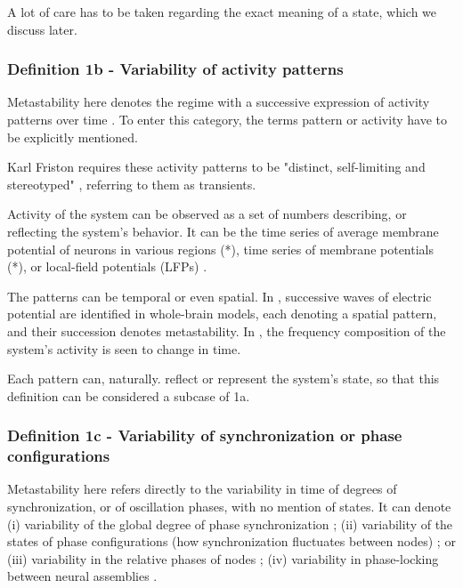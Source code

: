 \documentclass[preprint,superscriptaddress,showpacs,amsmath,amssymb,aps,pre,floatfix]{revtex4-1}
\theoremstyle{definition}
\begin{document}
A lot of care has to be taken regarding the exact meaning of a state, which we discuss later. %


\subsubsection{Definition 1b - Variability of activity patterns}
\label{sec:varpatterns}
Metastability here denotes the regime with a successive expression of activity patterns over time \cite{friston_1997, friston_2000transients, varela_2001, roberts_2019}. To enter this category, the terms pattern or activity have to be explicitly mentioned.

Karl Friston requires these activity patterns to be "distinct, self-limiting and stereotyped" \cite{friston_1997}, referring to them as transients. 

Activity of the system can be observed as a set of numbers describing, or reflecting the system's behavior. It can be the time series of average membrane potential of neurons in various regions \cite{roberts_2019}(*), time series of membrane potentials \cite{friston_1997, friston_2000transients}(*), or local-field potentials (LFPs) \cite{friston_2000transients}. 

The patterns can be temporal or even spatial. In \cite{roberts_2019}, successive waves of electric potential are identified in whole-brain models, each denoting a spatial pattern, and their succession denotes metastability. In \cite{friston_2000transients}, the frequency composition of the system's activity is seen to change in time.

Each pattern can, naturally. reflect or represent the system's state, so that this definition can be considered a subcase of 1a. 

\subsubsection{Definition 1c - Variability of synchronization or phase configurations}
\label{sec:varsync}
Metastability here refers directly to the variability in time of degrees of synchronization, or of oscillation phases, with no mention of states. 
It can denote (i) variability of the global degree of phase synchronization \cite{cabral_2011, deco_2017}; (ii) variability of the states of phase configurations (how synchronization fluctuates between nodes) \cite{deco_2016, deco_2017}; or (iii) variability in the relative phases of nodes \cite{ponce-alvarez_2015, tognoli_2014}; (iv) variability in phase-locking between neural assemblies \cite{aguilera_2016}. 
\end{document}
